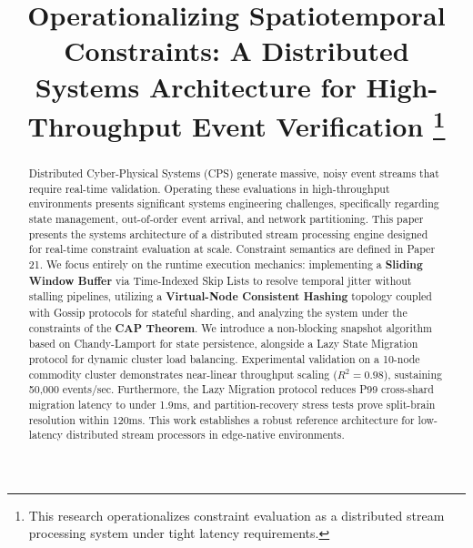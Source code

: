 \documentclass[conference]{IEEEtran}
\begin{document}
\title{Operationalizing Spatiotemporal Constraints: A Distributed Systems Architecture for High-Throughput Event Verification
\thanks{This research operationalizes constraint evaluation as a distributed stream processing system under tight latency requirements.}
}

\author{
}

\maketitle

\begin{abstract}
Distributed Cyber-Physical Systems (CPS) generate massive, noisy event streams that require real-time validation. Operating these evaluations in high-throughput environments presents significant systems engineering challenges, specifically regarding state management, out-of-order event arrival, and network partitioning. This paper presents the systems architecture of a distributed stream processing engine designed for real-time constraint evaluation at scale. Constraint semantics are defined in Paper 21. We focus entirely on the runtime execution mechanics: implementing a \textbf{Sliding Window Buffer} via Time-Indexed Skip Lists to resolve temporal jitter without stalling pipelines, utilizing a \textbf{Virtual-Node Consistent Hashing} topology coupled with Gossip protocols for stateful sharding, and analyzing the system under the constraints of the \textbf{CAP Theorem}. We introduce a non-blocking snapshot algorithm based on Chandy-Lamport for state persistence, alongside a Lazy State Migration protocol for dynamic cluster load balancing. Experimental validation on a 10-node commodity cluster demonstrates near-linear throughput scaling ($R^2=0.98$), sustaining 50,000 events/sec. Furthermore, the Lazy Migration protocol reduces P99 cross-shard migration latency to under 1.9ms, and partition-recovery stress tests prove split-brain resolution within 120ms. This work establishes a robust reference architecture for low-latency distributed stream processors in edge-native environments.
\end{abstract}
\end{document}
